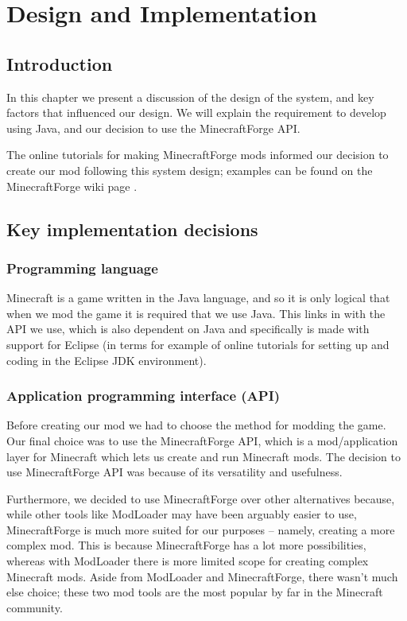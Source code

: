 \chapter{Design and Implementation}

\section{Introduction}
In this chapter we present a discussion of the design of the system, 
and key factors that influenced our design. We will explain the requirement 
to develop using Java, and our decision to use the MinecraftForge API.

The online tutorials for making MinecraftForge mods informed our decision to 
create our mod following this system design; examples can be found on the
MinecraftForge wiki page \cite{website:mcforgewiki}.

\section{Key implementation decisions}

\subsection{Programming language}
Minecraft is a game written in the Java language, and so it is 
only logical that when we mod the game it is required that we use 
Java. This links in with the API we use, which is also dependent 
on Java and specifically is made with support for Eclipse (in 
terms for example of online tutorials for setting up and coding 
in the Eclipse JDK environment). 

\subsection{Application programming interface (API)}
Before creating our mod we had to choose the method for modding 
the game. Our final choice was to use the MinecraftForge API, which 
is a mod/application layer for Minecraft which lets us create and 
run Minecraft mods. The decision to use MinecraftForge API was 
because of its versatility and usefulness.

Furthermore, we decided 
to use MinecraftForge over other alternatives because, while other 
tools like ModLoader may have been arguably easier to use, MinecraftForge 
is much more suited for our purposes – namely, creating a more complex 
mod. This is because MinecraftForge has a lot more possibilities, whereas 
with ModLoader there is more limited scope for creating complex Minecraft 
mods. Aside from ModLoader and MinecraftForge, there wasn’t much else 
choice; these two mod tools are the most popular by far in the Minecraft 
community.  

